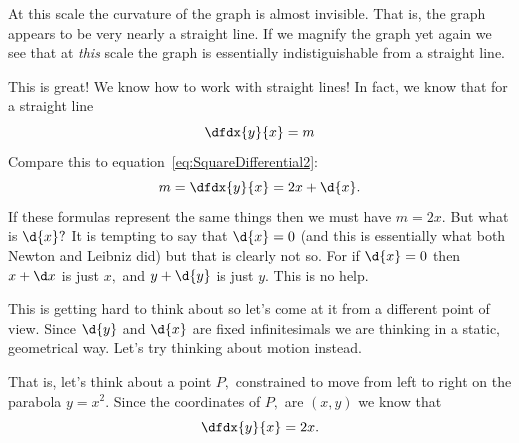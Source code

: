 At this scale the curvature of the graph is almost invisible. That is,
the graph appears to be very nearly a straight line. If we magnify the
graph yet again we see that at \emph{this} scale the graph is
essentially indistiguishable from a straight line.




This is great! We know how to work with straight lines! In fact, we
know that for a straight line 
\[\dfdx{y}{x} = m\]
Compare this to equation~\ref{eq:SquareDifferential2}:
\[m=\dfdx{y}{x} = 2x+\d{x}.\]
If these formulas represent the same things then we must have $m=2x.$
But what is $\d{x}?$ It is tempting to say that $\d{x}=0$ (and this is
essentially what both Newton and Leibniz did) but that is clearly not
so. For if $\d{x}=0$  then $x+\d x$ is
just $x,$  and $y+\d{y}$ is just $y.$ This is no help.


This is getting hard to think about so let's come at it from a
different point of view. Since $\d{y}$ and $\d{x}$ are fixed
infinitesimals we are thinking in a static, geometrical way. Let's try
thinking about motion instead. 

That is, let's think about a point $P,$ constrained to move from left
to right on the parabola $y=x^2.$ Since the coordinates of $P,$ are
$(x, y)$  we know that
\[\dfdx{y}{x} = 2x.\]


